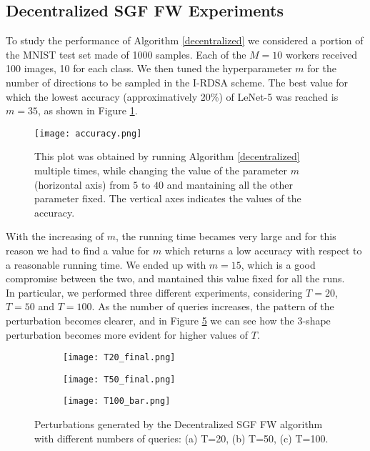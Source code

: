 \subsection{Decentralized SGF FW Experiments}
To study the performance of Algorithm \ref{decentralized} we considered a portion of the MNIST test set made of 1000 samples. Each of the $M=10$ workers received 100 images, 10 for each class.
We then tuned the hyperparameter $m$ for the number of directions to be sampled in the I-RDSA scheme. The best value for which the lowest accuracy (approximatively 20\%) of LeNet-5 was reached is $m=35$, as shown in Figure \ref{fig:accuracy}.\\
\begin{figure}[htbp]
	\centering
	\texttt{[image: accuracy.png]}
	\caption{{\small This plot was obtained by running Algorithm \ref{decentralized} multiple times, while changing the value of the parameter $m$ (horizontal axis) from $5$ to $40$ and mantaining all the other parameter fixed. The vertical axes indicates the values of the accuracy.}}
	\label{fig:accuracy}
\end{figure}
\indent With the increasing of $m$, the running time becames very large and for this reason we had to find a value for $m$ which returns a low accuracy with respect to a reasonable running time. We ended up with $m=15$, which is a good compromise between the two, and mantained this value fixed for all the runs.\\
\indent In particular, we performed three different experiments, considering $T=20$, $T=50$ and $T=100$. As the number of queries increases, the pattern of the perturbation becomes clearer, and in Figure \ref{fig:decentralized_perturbations} we can see how the 3-shape perturbation becomes more evident for higher values of $T$. 
\begin{figure}[h]
	\centering
	\begin{subfigure}[b]{0.15\textwidth}
		\centering
		\texttt{[image: T20\_final.png]}
		\caption{}
		\label{fig:decentralized_perturbation_20}
	\end{subfigure}
	\hfill
	\begin{subfigure}[b]{0.15\textwidth}
		\texttt{[image: T50\_final.png]}
		\caption{}
		\label{fig:decentralized_perturbation_50}
	\end{subfigure}
	\hfill
	\begin{subfigure}[b]{0.15\textwidth}
		\texttt{[image: T100\_bar.png]}
		\caption{}
		\label{fig:decentralized_perturbation_100}
	\end{subfigure}
	\caption{{\small Perturbations generated by the Decentralized SGF FW algorithm with different numbers of queries: (a) T=20, (b) T=50, (c) T=100.}}
	\label{fig:decentralized_perturbations}
\end{figure}

